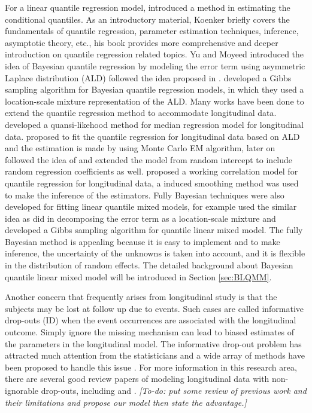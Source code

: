 For a linear quantile regression model, \citep{koenker1978regression} introduced a method in estimating the conditional quantiles. As an introductory material, Koenker \citep{koenker2001quantile} briefly covers the fundamentals of quantile regression, parameter estimation techniques, inference, asymptotic theory, etc., his book \citep{koenker2005quantile} provides more comprehensive and deeper introduction on quantile regression related topics.  Yu and Moyeed \citep{yu2001bayesian} introduced the idea of Bayesian quantile regression by modeling the error term using asymmetric Laplace distribution (ALD) followed the idea proposed in \citep{koenker1978regression}. \citep{kozumi2011gibbs} developed a Gibbs sampling algorithm for Bayesian quantile regression models, in which they used a location-scale mixture representation of the ALD. Many works have been done to extend the quantile regression method to accommodate longitudinal data. \citep{jung1996quasi} developed a quansi-likehood method for median regression model for longitudinal data. \citep{geraci2007quantile} proposed to fit the quantile regression for longitudinal data based on ALD and the estimation is made by using Monte Carlo EM algorithm, later on \citep{liu2009mixed} followed the idea of \citep{geraci2007quantile} and extended the model from random intercept to include random regression coefficients as well. \citep{fu2012quantile} proposed  a working correlation model for quantile regression for longitudinal data, a induced smoothing method was used to make the inference of the estimators. Fully Bayesian techniques were also developed for fitting linear quantile mixed models, for example \citep{luo2012bayesian} used the similar idea as \citep{kozumi2011gibbs} did in decomposing the error term as a location-scale mixture and developed a Gibbs sampling algorithm for quantile linear mixed model. The fully Bayesian method is appealing because it is easy to implement and to make inference, the uncertainty of the unknowns is taken into account, and it is flexible in the distribution of random effects. The detailed background about Bayesian quantile linear mixed model will be introduced in Section \ref{sec:BLQMM}.\par

Another concern that frequently arises from longitudinal study is that the subjects may be lost at follow up due to events. Such cases are called informative drop-outs (ID) when the event occurrences are associated with the longitudinal outcome. Simply ignore the missing mechanism can lead to biased estimates of the parameters in the longitudinal model. The informative drop-out problem has attracted much attention from the statisticians and a wide array of methods have been proposed to handle this issue \citep{diggle1994informative} \citep{lipsitz1997quantile} \citep{touloumi2003comparison} \citep{yuan2010bayesian}. For more information in this research area, there are several good review papers of modeling longitudinal data with non-ignorable drop-outs, including \citep{diggle2007analysis} and \citep{hogan2004handling}. \emph{[To-do: put some review of previous work and their limitations and propose our model then state the advantage.]}


